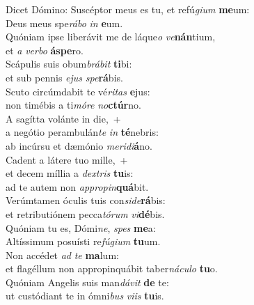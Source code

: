 \evenverse Dicet Dómino: Suscéptor meus es tu, et refú\textit{gi}\textit{um} \textbf{me}um:~\*\\
\evenverse Deus meus spe\textit{rá}\textit{bo} \textit{in} \textbf{e}um.\\
\oddverse Quóniam ipse liberávit me de láque\textit{o} \textit{ve}\textbf{nán}tium,~\*\\
\oddverse et \textit{a} \textit{ver}\textit{bo} \textbf{á}\textbf{spe}ro.\\
\evenverse Scápulis suis obum\textit{brá}\textit{bit} \textbf{ti}bi:~\*\\
\evenverse et sub pennis \textit{e}\textit{jus} \textit{spe}\textbf{rá}bis.\\
\oddverse Scuto circúmdabit te vé\textit{ri}\textit{tas} \textbf{e}jus:~\*\\
\oddverse non timébis a ti\textit{mó}\textit{re} \textit{no}\textbf{ctúr}no.\\
\evenverse A sagítta volánte in die,~+\\
\evenverse  a negótio perambulán\textit{te} \textit{in} \textbf{té}nebris:~\*\\
\evenverse ab incúrsu et dæmónio \textit{me}\textit{ri}\textit{di}\textbf{á}no.\\
\oddverse Cadent a látere tuo mille,~+\\
\oddverse  et decem míllia a \textit{dex}\textit{tris} \textbf{tu}is:~\*\\
\oddverse ad te autem non \textit{ap}\textit{pro}\textit{pin}\textbf{quá}bit.\\
\evenverse Verúmtamen óculis tuis con\textit{si}\textit{de}\textbf{rá}bis:~\*\\
\evenverse et retributiónem pecca\textit{tó}\textit{rum} \textit{vi}\textbf{dé}bis.\\
\oddverse Quóniam tu es, Dómi\textit{ne}, \textit{spes} \textbf{me}a:~\*\\
\oddverse Altíssimum posuísti re\textit{fú}\textit{gi}\textit{um} \textbf{tu}um.\\
\evenverse Non accédet \textit{ad} \textit{te} \textbf{ma}lum:~\*\\
\evenverse et flagéllum non appropinquábit taber\textit{ná}\textit{cu}\textit{lo} \textbf{tu}o.\\
\oddverse Quóniam Angelis suis man\textit{dá}\textit{vit} \textbf{de} te:~\*\\
\oddverse ut custódiant te in ómni\textit{bus} \textit{vi}\textit{is} \textbf{tu}is.\\
